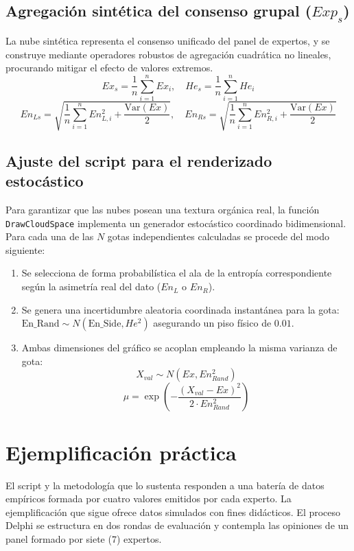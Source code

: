 \documentclass[11pt,a4paper]{article}
\begin{document}
\subsection{Agregación sintética del consenso grupal \texorpdfstring{($Exp_s$)}{Exp\_s}}
La nube sintética representa el consenso unificado del panel de expertos, y se construye mediante operadores robustos de agregación cuadrática no lineales, procurando mitigar el efecto de valores extremos.
\begin{equation}
    Ex_s = \frac{1}{n}\sum_{i=1}^{n} Ex_i, \quad He_s = \frac{1}{n}\sum_{i=1}^{n} He_i
\end{equation}
\begin{equation}
    En_{Ls} = \sqrt{\frac{1}{n}\sum_{i=1}^{n} En_{L,i}^2 + \frac{\text{Var}(Ex)}{2}}, \quad En_{Rs} = \sqrt{\frac{1}{n}\sum_{i=1}^{n} En_{R,i}^2 + \frac{\text{Var}(Ex)}{2}}
\end{equation}

\subsection{Ajuste del script para el renderizado estocástico}
Para garantizar que las nubes posean una textura orgánica real, la función \texttt{DrawCloudSpace} implementa un generador estocástico coordinado bidimensional. Para cada una de las $N$ gotas independientes calculadas se procede del modo siguiente:
\begin{enumerate}
    \item Se selecciona de forma probabilística el ala de la entropía correspondiente según la asimetría real del dato ($En_L$ o $En_R$).
    \item Se genera una incertidumbre aleatoria coordinada instantánea para la gota: $\text{En\_Rand} \sim N(\text{En\_Side}, He^2)$ asegurando un piso físico de $0.01$.
    \item Ambas dimensiones del gráfico se acoplan empleando la misma varianza de gota:
    \begin{equation}
        X_{val} \sim N(Ex, En_{Rand}^2)
    \end{equation}
    \begin{equation}
        \mu = \exp\left(-\frac{(X_{val} - Ex)^2}{2 \cdot En_{Rand}^2}\right)
    \end{equation}
\end{enumerate}

\section{Ejemplificación práctica}
El script y la metodología que lo sustenta responden a una batería de datos empíricos formada por cuatro valores emitidos por cada experto. La ejemplificación que sigue ofrece datos simulados con fines didácticos. El proceso Delphi se estructura en dos rondas de evaluación y contempla las opiniones de un panel formado por siete (7) expertos.
\end{document}
